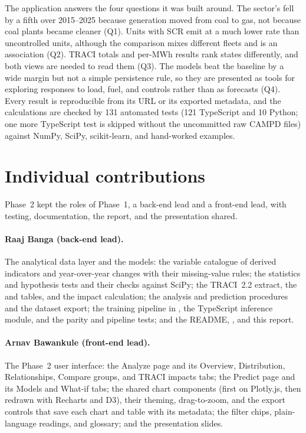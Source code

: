 \documentclass[11pt,a4paper]{article}
\begin{document}
The application answers the four questions it was built around. The sector's \COtwo{} fell by
a fifth over 2015--2025 because generation moved from coal to gas, not because coal plants became
cleaner (Q1). Units with SCR emit \NOx{} at a much lower rate than uncontrolled units, although
the comparison mixes different fleets and is an association (Q2). TRACI totals and per-MWh results
rank states differently, and both views are needed to read them (Q3). The models beat the
baseline by a wide margin but not a simple persistence rule, so they are presented as tools for
exploring responses to load, fuel, and controls rather than as forecasts (Q4). Every result is
reproducible from its URL or its exported metadata, and the calculations are checked by 131
automated tests (121 TypeScript and 10 Python; one more TypeScript test is skipped without
the uncommitted raw CAMPD files) against NumPy, SciPy, scikit-learn, and hand-worked examples.

\section{Individual contributions}
\label{sec:contributions}

Phase~2 kept the roles of Phase~1, a back-end lead and a front-end lead, with testing,
documentation, the report, and the presentation shared.

\paragraph{Raaj Banga (back-end lead).} The analytical data layer and the models: the variable
catalogue of derived indicators and year-over-year changes with their missing-value rules; the
statistics and hypothesis tests and their checks against SciPy; the TRACI~2.2 extract, the
 and  tables, and the impact calculation; the analysis and
prediction procedures and the dataset export; the training pipeline in , the
TypeScript inference module, and the parity and pipeline tests; and the README,
, and this report.

\paragraph{Arnav Bawankule (front-end lead).} The Phase~2 user interface: the Analyze page and
its Overview, Distribution, Relationships, Compare groups, and TRACI impacts tabs; the Predict
page and its Models and What-if tabs; the shared chart components (first on Plotly.js, then
redrawn with Recharts and D3), their theming, drag-to-zoom, and the export controls that save each
chart and table with its metadata; the filter chips, plain-language readings, and glossary; and
the presentation slides.
\end{document}

